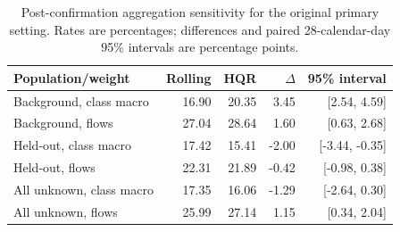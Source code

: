 \begin{table}[tbp]
\caption{Post-confirmation aggregation sensitivity for the original primary setting. Rates are percentages; differences and paired 28-calendar-day 95\% intervals are percentage points.}\label{tab:revision-aggregates}
\centering\small\setlength{\tabcolsep}{4pt}
\begin{tabular}{lrrrr}
\toprule
Population/weight & Rolling & HQR & $\Delta$ & 95\% interval\\\midrule
Background, class macro & 16.90 & 20.35 & 3.45 & [2.54, 4.59]\\
Background, flows & 27.04 & 28.64 & 1.60 & [0.63, 2.68]\\
Held-out, class macro & 17.42 & 15.41 & -2.00 & [-3.44, -0.35]\\
Held-out, flows & 22.31 & 21.89 & -0.42 & [-0.98, 0.38]\\
All unknown, class macro & 17.35 & 16.06 & -1.29 & [-2.64, 0.30]\\
All unknown, flows & 25.99 & 27.14 & 1.15 & [0.34, 2.04]\\
\bottomrule\end{tabular}\end{table}
